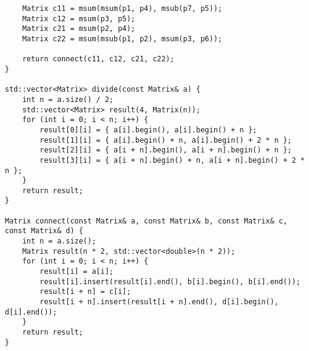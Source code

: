 \documentclass{report}
\begin{document}
\begin{lstlisting}
    Matrix c11 = msum(msum(p1, p4), msub(p7, p5));
    Matrix c12 = msum(p3, p5);
    Matrix c21 = msum(p2, p4);
    Matrix c22 = msum(msub(p1, p2), msum(p3, p6));

    return connect(c11, c12, c21, c22);
}

std::vector<Matrix> divide(const Matrix& a) {
    int n = a.size() / 2;
    std::vector<Matrix> result(4, Matrix(n));
    for (int i = 0; i < n; i++) {
        result[0][i] = { a[i].begin(), a[i].begin() + n };
        result[1][i] = { a[i].begin() + n, a[i].begin() + 2 * n };
        result[2][i] = { a[i + n].begin(), a[i + n].begin() + n };
        result[3][i] = { a[i + n].begin() + n, a[i + n].begin() + 2 * n };
    }
    return result;
}

Matrix connect(const Matrix& a, const Matrix& b, const Matrix& c, const Matrix& d) {
    int n = a.size();
    Matrix result(n * 2, std::vector<double>(n * 2));
    for (int i = 0; i < n; i++) {
        result[i] = a[i];
        result[i].insert(result[i].end(), b[i].begin(), b[i].end());
        result[i + n] = c[i];
        result[i + n].insert(result[i + n].end(), d[i].begin(), d[i].end());
    }
    return result;
}


\end{lstlisting}
\end{document}
